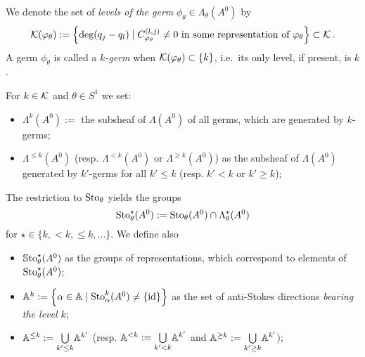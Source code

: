 \begin{defn}
  We denote the set of \emph{levels of the germ}
  $\phi_{\theta}\in\Lambda_\theta(A^0)$ by
  \[
    \mathcal{K}(\varphi_\theta):= \left\{\deg(q_j-q_l)\mid C_{\varphi_\theta}^{(l,j)}\neq0
      \text{ in some representation of }\varphi_\theta\right\} \subset \mathcal{K} \,.
  \]
  A germ $\phi_\theta$ is called a \emph{$k$-germ} when
  $\mathcal{K}(\varphi_{\theta})\subset\{k\}$, i.e.\ its only level, if present, is $k$.
\end{defn}
\begin{notations}
  For $k\in\mathcal{K}$ and $\theta\in S^1$ we set:
  \begin{itemize}
    \item $\Lambda^{k}(A^0):=$ the subsheaf of $\Lambda(A^0)$ of all germs,
      which are generated by $k$-germs;
    \item $\Lambda^{\leq k}(A^0)$ (resp. $\Lambda^{<k}(A^0)$ or
      $\Lambda^{\geq k}(A^0)$) as the subsheaf of $\Lambda(A^0)$ generated by
      $k'$-germs for all $k'\leq k$ (resp. $k'<k$ or $k'\geq k$);
  \end{itemize}
  The restriction to $\operatorname{Sto}_\theta$ yields the groups
  \[
    \operatorname{Sto}_\theta^\star(A^0):=\operatorname{Sto}_\theta(A^0)\cap\Lambda_\theta^{\star}(A^0)
  \]
  for $\star\in\{k,<k,\leq k,\dots\}$.
  We define also
  \begin{itemize}
    \item $\operatorname{\mathbb{S}to}^\star_\theta(A^0)$ as the groups of representations, which
      correspond to elements of  $\operatorname{Sto}^\star_\theta(A^0)$;
    \item $\mathbb{A}^k:=\left\{\alpha\in\mathbb{A}\mid\operatorname{Sto}_\alpha^k(A^0)\neq\{\operatorname{id}\}\right\}$
      as the set of anti-Stokes directions \emph{bearing the level $k$};
    \item $\mathbb{A}^{\leq k}:=\underset{k'\leq k}\bigcup\mathbb{A}^{k'}$ (resp.
      $\mathbb{A}^{<k}:=\underset{k'<k}\bigcup\mathbb{A}^{k'}$ and
      $\mathbb{A}^{\geq k}:=\underset{k'\geq k}\bigcup\mathbb{A}^{k'}$);
      \begin{s-rem}

\end{s-rem}
\end{itemize}
\end{notations}
